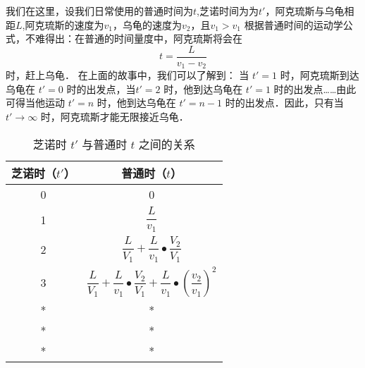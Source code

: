 我们在这里，设我们日常使用的普通时间为$t$,芝诺时间为为$t'$，阿克琉斯与乌龟相距$L$,阿克琉斯的速度为$v_1$，乌龟的速度为$v_2$，且$v_1>v_1$
根据普通时间的运动学公式，不难得出：在普通的时间量度中，阿克琉斯将会在
\begin{equation}
t = \dfrac{L}{v_1 - v_2}
\end{equation}
时，赶上乌龟．
在上面的故事中，我们可以了解到：
当 $t'=1$ 时，阿克琉斯到达乌龟在 $t'=0$ 时的出发点，当$t'=2$ 时，他到达乌龟在 $t'=1$ 时的出发点……由此可得当他运动 $t'=n$ 时，他到达乌龟在 $t'=n-1$ 时的出发点．因此，只有当 $t'\to\infty$ 时，阿克琉斯才能无限接近乌龟．\begin{table}[ht]
\centering
\caption{芝诺时 $t'$ 与普通时 $t$ 之间的关系}\label{zeno_tab1}
\begin{tabular}{|c|c|}
\hline
芝诺时（$t'$） & 普通时（$t$） \\
\hline
0 & 0 \\
\hline
1 & $\dfrac{L}{v_1}$ \\
\hline
2 & $\dfrac{L}{V_1}+\dfrac{L}{v_1}\bullet\dfrac{V_2}{V_1}$ \\
\hline
3 & $\dfrac{L}{V_1}+\dfrac{L}{v_1}\bullet\dfrac{V_2}{V_1}+\dfrac{L}{v_1}\bullet(\dfrac{v_2}{v_1})^2$ \\
\hline
* & * \\
\hline
* & * \\
\hline
* & * \\
\hline
\end{tabular}
\end{table}